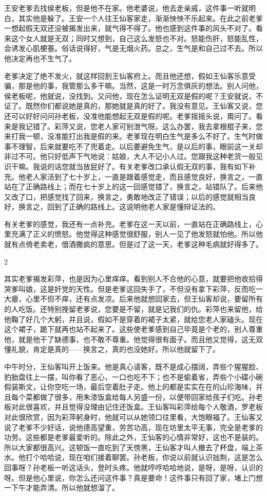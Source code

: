 王安老爹去找侯老板，但是他不在家。他老婆说，他去走亲戚，这件事一听就明白，其实他是躲了。王安一个人往王仙客家走，渐渐怏怏不乐起来。在此之前老爹一想起假无双还没被揭发出来，就气得不得了。他也感到这件事的风头不对了。看来这个女人就是无双；同时又想到，自己这么发怒也不对。怒能伤肝，怒能乱性，会诱发心肌梗塞。俗话说得好，气是无烟火药。总之，生气是和自己过不去。所以他决定再也不生气了。 

老爹决定了绝不发火，就这样回到王仙客府上。而且他还想，假如王仙客乐意受骗，那是他的事，我管那么多干嘛。当然，这是一时万念俱灰的想法。别人问他，侯老板呢，他就说，没找到。又问他，现在怎么证明无双是假的呢？王安就说，不证了。既然你们都说她是真的，那她就是真的好了。我没有意见。王仙客又说，您还可以好好问问孙老板，没准他能想起无双是假的呢。老爹摇摇头说，甭问了。看来是我记错了。彩萍又说，您老人家可别泄气呀。这么办罢，我去拿根棍子来，您来打我一顿，没准能打出我是假的来。老爹现在明白生气是多么不好了。生气时做事不理智，后来就要吃不了兜着走。以后要避免生气，是以后的事，眼前这一关却非过不可。他只好低声下气地说：姑娘，大人不记小人过。您跟我这种老货一般见识干嘛。我说的话您就当放屁好了。有关老爹改口承认假无双的事，我有如下补充。他老人家活到了七十岁上，一直是跟着感觉走，而且感觉良好，换言之，一直站在了正确路线上；而在七十岁上的这一回感觉错了，换言之，站错队了。后来他又改了口，把感觉找了回来，换言之，勇敢地改正了错误；以后的感觉就相当良好，换言之，回到了正确的路线上。这说明他老人家是懂辩证法的。 

有关老爹的感觉，我还有一点补充。老爹在这一天以前，一直站在正确路线上，心里充满了正义的愤怒。他觉得这种感觉很舒服，别人一见了他发怒就怕他。所以他就有点倚老卖老，借酒撒疯的意思。但是过了这一天，老爹这种毛病就好得多了。 

2 

其实老爹揭发彩萍，也是因为心里痒痒。看到别人不合他的心意，就要把他收拾得哭爹叫娘，这是奸党的天性。但是老爹这回失手了，不但没有拿下彩萍，反而吃一大瘪，心里不但不痒，还有点发凉。后来他就想回家去，但王仙客却说，要留所有的人吃饭。还特别挽留老爹说，您要是不留，就是记我们的仇。彩萍也来留他，给他鞠了好几个大躬，并且说，假如不是穿着的裙子太紧，就给您老人家磕头。现在这个裙子，跪下就再也站不起来了。这些使老爹感到自己毕竟是个老的，别人尊重他，就是他干了缺德事，也不敢不尊重。他觉得很有面子。而且他又觉得，这无双懂礼貌，肯定是真的——换言之，真的也没她好。所以他就留下了。 

中午时分，王仙客叫开上饭来。他是真心请客，既不是成心摆阔，弄些个猩猩脸、豹胎盘往上一摆，叫你看了恶心，一口也吃不下；也不是偷着省，弄些个小碟小碗假装斯文，让你空吃一场，最后空着肚子走。他上的都是实实在在的山珍海味，并且每个菜都做了很多，用朱漆饭盒给每人另盛一份，以便带回家给孩子们吃。孙老板对此很喜欢，并且觉得没理由记住还饭盒。王仙客叫彩萍给每个人敬酒，罗老板对此很欣赏，因为彩萍躬身时，他就可以从她领口往里看，大饱眼福了。王仙客又说了老爹不少好话，说他德高望重，劳苦功高，现在坊里太平无事，完全是老爹的功劳。这些都是老爹最爱听的。除此之外，王仙客的心情非常好，这也不是装的。所以大家都很高兴。这顿饭一直吃到了天傍黑，王仙客才叫人撤去了杯盘，端上茶水。他打个哈哈说，现在咱们接着聊罢。孙老板，你说以前就认识拙荆，这是怎么回事呀？孙老板一听这话头，登时头疼。他就哼哼哈哈地说，是呀，是呀，认识的呀。但是他心里说，你怎么还问这件事？真是要命！这件事只有回了家，堵上门想一下午才能弄清。所以他就想溜了。 

